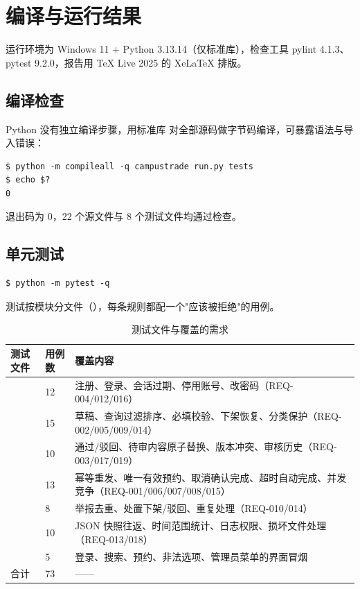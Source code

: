 \section{编译与运行结果}

运行环境为 Windows 11 + Python 3.13.14（仅标准库），检查工具 pylint 4.1.3、pytest 9.2.0，报告用 TeX Live 2025 的 XeLaTeX 排版。

\subsection{编译检查}

Python 没有独立编译步骤，用标准库  对全部源码做字节码编译，可暴露语法与导入错误：

\begin{lstlisting}
$ python -m compileall -q campustrade run.py tests
$ echo $?
0
\end{lstlisting}

退出码为 0，22 个源文件与 8 个测试文件均通过检查。

\subsection{单元测试}

\begin{lstlisting}
$ python -m pytest -q
\end{lstlisting}



测试按模块分文件（），每条规则都配一个"应该被拒绝"的用例。

\begin{table}[htbp]
\centering
\caption{测试文件与覆盖的需求}\label{tab:tests}
\renewcommand{\arraystretch}{1.15}
\begin{tabularx}{\textwidth}{@{}L{3.4cm}L{1.4cm}Y@{}}
\toprule
测试文件 & 用例数 & 覆盖内容 \\
\midrule
{} & 12 & 注册、登录、会话过期、停用账号、改密码（REQ-004/012/016） \\
 & 15 & 草稿、查询过滤排序、必填校验、下架恢复、分类保护（REQ-002/005/009/014） \\
 & 10 & 通过/驳回、待审内容原子替换、版本冲突、审核历史（REQ-003/017/019） \\
 & 13 & 幂等重发、唯一有效预约、取消确认完成、超时自动完成、并发竞争（REQ-001/006/007/008/015） \\
 & 8 & 举报去重、处置下架/驳回、重复处理（REQ-010/014） \\
 & 10 & JSON 快照往返、时间范围统计、日志权限、损坏文件处理（REQ-013/018） \\
 & 5 & 登录、搜索、预约、非法选项、管理员菜单的界面冒烟 \\
\midrule
合计 & 73 & —— \\
\bottomrule
\end{tabularx}
\end{table}

